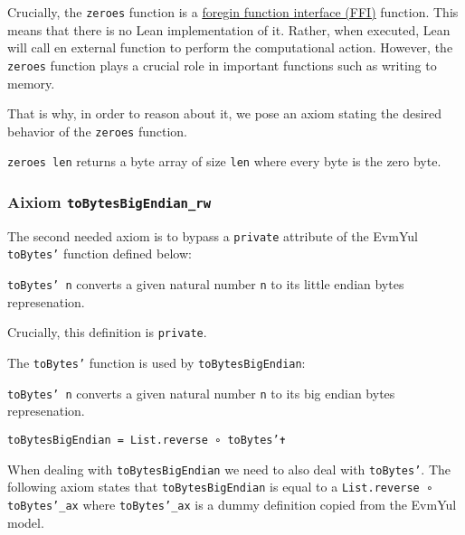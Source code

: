 Crucially, the \texttt{zeroes} function is a
\href{https://en.wikipedia.org/wiki/Foreign_function_interface}{foregin function interface (FFI)}
function. This means that there is no Lean implementation of it. Rather, when
executed, Lean will call en external function to perform the computational
action.
However, the \texttt{zeroes} function plays a crucial role in important
functions such as writing to memory.

That is why, in order to reason about it, we pose an axiom stating the desired
behavior of the \texttt{zeroes} function.

\begin{theorem}\label{ax:ffi_zeroes}
\texttt{zeroes len} returns a byte array of size \texttt{len} where every byte
is the zero byte.
\end{theorem}

\subsubsection{\textbf{Aixiom \texttt{toBytesBigEndian_rw}}}

The second needed axiom is to bypass a \texttt{private} attribute of the EvmYul
\texttt{toBytes'} function defined below:

\begin{definition}[toBytes']\label{def:toBytes'}\leanok
\texttt{toBytes' n} converts a given natural number \texttt{n} to its little
endian bytes represenation.

Crucially, this definition is \texttt{private}.
\end{definition}

The \texttt{toBytes'} function is used by \texttt{toBytesBigEndian}:

\begin{definition}[toBytesBigEndian]
\label{def:toBytesBigEndian}\leanok
\texttt{toBytes' n} converts a given natural number \texttt{n} to its big
endian bytes represenation.

\texttt{toBytesBigEndian = List.reverse ∘ toBytes'✝}
\end{definition}

When dealing with \texttt{toBytesBigEndian} we need to also deal with
\texttt{toBytes'}. The following axiom states that \texttt{toBytesBigEndian} is
equal to a \texttt{List.reverse ∘ toBytes'_ax} where \texttt{toBytes'_ax} is a
dummy definition copied from the EvmYul model.

